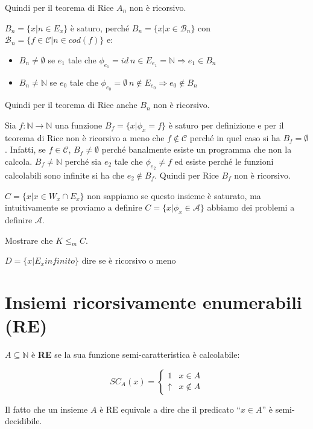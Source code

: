 Quindi per il teorema di Rice $ A_n $ non è ricorsivo.

$ B_n = \{  x | n \in E_x\} $ è saturo, perché $ B_n  = \{ x | x \in \mathcal{B}_n\}$ con $ \mathcal{B}_n = \{ f \in \mathcal{C} | n \in cod(f) \} $ e:
\begin{itemize}
	\item $ B_n \neq \emptyset $ se $ e_1 $ tale che $ \phi_{e_1} = id \: n \in E_{e_1} = \mathbb{N} \Rightarrow e_1 \in B_n$ 
	\item $ B_n \neq \mathbb{N} $ se $ e_0 $ tale che $\phi_{e_0} = \emptyset \: n \notin E_{e_0} \Rightarrow e_0 \notin B_n$ 	
\end{itemize}

Quindi per il teorema di Rice anche $ B_n $ non è ricorsivo.


Sia $ f : \mathbb{N} \rightarrow \mathbb{N} $ una funzione $ B_f = \{ x | \phi_x = f \} $ è saturo per definizione e per il teorema di Rice non è ricorsivo a meno che $ f \notin \mathcal{C} $ perché in quel caso si ha $ B_f = \emptyset $. Infatti, se $ f \in \mathcal{C} $, $ B_f \neq \emptyset $ perché banalmente esiste un programma che non la calcola. $ B_f \neq \mathbb{N} $ perché sia $ e_2 $ tale che $ \phi_{e_2} \neq f$ ed esiste perché le funzioni calcolabili sono infinite si ha che $ e_2 \notin B_f $.
Quindi per Rice $ B_f $ non è ricorsivo.


$ C = \{ x | x \in W_x \cap E_x \} $ non sappiamo se questo insieme è saturato, ma intuitivamente se proviamo a definire $ C = \{x | \phi_x \in \mathcal{A} \} $ abbiamo dei problemi a definire $ \mathcal{A} $.

Mostrare che $ K \leq_m C $.

$ D = \{ x | E_x infinito \}$ dire se è ricorsivo o meno

\section{Insiemi ricorsivamente enumerabili (RE)}

$A \subseteq \mathbb{N}$ è \textbf{RE} se la sua funzione semi-caratteristica è calcolabile:

$$
SC_A(x) = \begin{cases}
1 & x \in A \\
\uparrow & x \notin A
\end{cases}
$$

Il fatto che un insieme $ A $ è RE equivale a dire che il predicato ``$ x \in A $'' è semi-decidibile.

